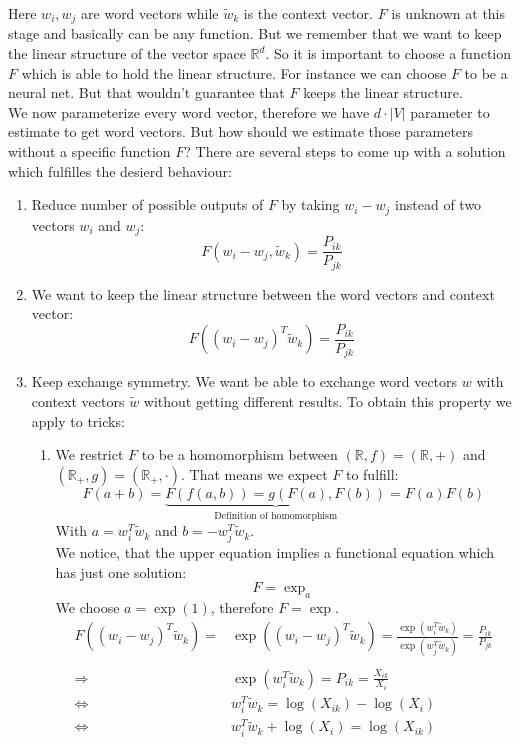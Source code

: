 Here $w_i, w_j$ are word vectors while $\tilde{w}_k$ is the context vector. 
$F$ is unknown at this stage and basically can be any function. But we remember
that we want to keep the linear structure of the vector space $\mathbb{R}^d$. So 
it is important to choose a function $F$ which is able to hold the linear 
structure. For instance we can choose $F$ to be a neural net. But that wouldn't 
guarantee that $F$ keeps the linear structure. \\

We now parameterize every word vector, therefore we have $d \cdot |V|$ 
parameter to estimate to get word vectors. But how should we estimate those parameters 
without a specific function $F$? There are several steps to come up with a solution
which fulfilles the desierd behaviour:

\begin{enumerate}
  \item 
    Reduce number of possible outputs of $F$ by taking $w_i - w_j$ instead of 
    two vectors $w_i$ and $w_j$:
    \[
    F(w_i - w_j, \tilde{w}_k) = \frac{P_{ik}}{P_{jk}}
    \]

  \item 
    We want to keep the linear structure between the word vectors and context
    vector:
    \[
    F\left((w_i - w_j)^T\tilde{w}_k\right) = \frac{P_{ik}}{P_{jk}}
    \]
   
  \item 
    Keep exchange symmetry. We want be able to exchange word vectors $w$ with
    context vectors $\tilde{w}$ without getting different results. To obtain
    this property we apply to tricks:
      \begin{enumerate}
        \item 
          We restrict $F$ to be a homomorphism between $(\mathbb{R}, f) = (\mathbb{R}, +)$ 
          and $(\mathbb{R}_+, g) = (\mathbb{R}_+, \cdot )$. That means we expect $F$
          to fulfill:
          \[
          F(a + b) = \underbrace{F(f(a, b)) = g(F(a), F(b))}_{\text{Definition of homomorphism}} =
            F(a)F(b)
          \]
          With $a = w_i^T\tilde{w}_k$ and $b = -w_j^T\tilde{w}_k$. \\
          We notice, that the upper equation implies a functional equation which has
          just one solution: 
          \[
          F = \exp_a
          \]  
          We choose $a = \exp(1)$, therefore $F = \exp$. 
          \begin{align*}
          F\left((w_i - w_j)^T\tilde{w}_k\right) = &\exp\left((w_i - w_j)^T\tilde{w}_k\right) =
            \frac{\exp(w_i^T\tilde{w}_k)}{\exp(w_j^T\tilde{w}_k)} = \frac{P_{ik}}{P_{jk}} \\ \\
          \Rightarrow\ &\exp(w_i^T\tilde{w}_k) = P_{ik} = \frac{X_{ik}}{X_i} \\
          \Leftrightarrow\ &w_i^T\tilde{w}_k = \log(X_{ik}) - \log(X_i) \\
          \Leftrightarrow\ &w_i^T\tilde{w}_k + \log(X_i) = \log(X_{ik})
          \end{align*}
   

\end{enumerate}
\end{enumerate}
